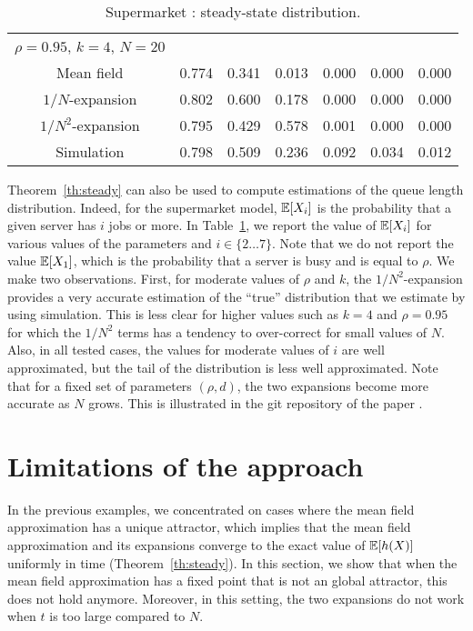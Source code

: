 \documentclass[sigconf]{acmart}
\newcommand\esp[1]{{\mathchoice{\besp{#1}}{\sesp{#1}}{\sesp{#1}}{\sesp{#1}}}}
\newcommand\besp[1]{\mathbb{E}\left[#1\right]}
\newcommand\sesp[1]{\mathbb{E}[#1]}
\begin{document}
\begin{table}[t]
\begin{tabular}{@{}|@{}c@{}|c|c|c|c|c|c|}
    $\rho{=}0.95$, $k{=}4$, $N{=}20$ &&&&&&\\
    Mean field		& 0.774 & 0.341 & 0.013 & 0.000 & 0.000 & 0.000 \\
    $1/N$-expansion	& 0.802 & 0.600 & 0.178 & 0.000 & 0.000 & 0.000 \\
    $1/N^2$-expansion	& 0.795 & 0.429 & 0.578 & 0.001 & 0.000 & 0.000 \\
    Simulation		& 0.798 & 0.509 & 0.236 & 0.092 & 0.034 & 0.012 \\
    \hline
  \end{tabular}
  \caption{Supermarket : steady-state distribution. }
  \label{tab:supermarket_distribution}
\end{table}


Theorem~\ref{th:steady} can also be used to compute estimations of the
queue length distribution. Indeed, for the supermarket model,
$\esp{X_i}$ is the probability that a given server has $i$ jobs or
more. In Table~\ref{tab:supermarket_distribution}, we report the value
of $\esp{X_i}$ for various values of the parameters and
$i\in\{2\dots7\}$. Note that we do not report the value $\esp{X_1}$,
which is the probability that a server is busy and is equal to
$\rho$. We make two observations. First, for moderate values of $\rho$
and $k$, the $1/N^2$-expansion provides a very accurate estimation of
the ``true'' distribution that we estimate by using simulation. This
is less clear for higher values such as $k=4$ and $\rho=0.95$ for
which the $1/N^2$ terms has a tendency to over-correct for small
values of $N$.  Also, in all tested cases, the values for moderate
values of $i$ are well approximated, but the tail of the distribution
is less well approximated.  Note that for a fixed set of parameters
$(\rho,d)$, the two expansions become more accurate as $N$ grows. This
is illustrated in the git repository of the paper
\cite{githubPaper2018}.





\section{Limitations of the approach}
\label{sec:limits}

In the previous examples, we concentrated on cases where the mean field
approximation has a unique attractor, which implies that the mean field
approximation and its expansions converge to the exact value of
$\esp{h(X)}$ uniformly in time (Theorem~\ref{th:steady}). In this
section, we show that when the mean field approximation has a fixed
point that is not an global attractor, this does not hold
anymore. Moreover, in this setting, the two expansions do not work
when $t$ is too large compared to $N$.
\end{document}
